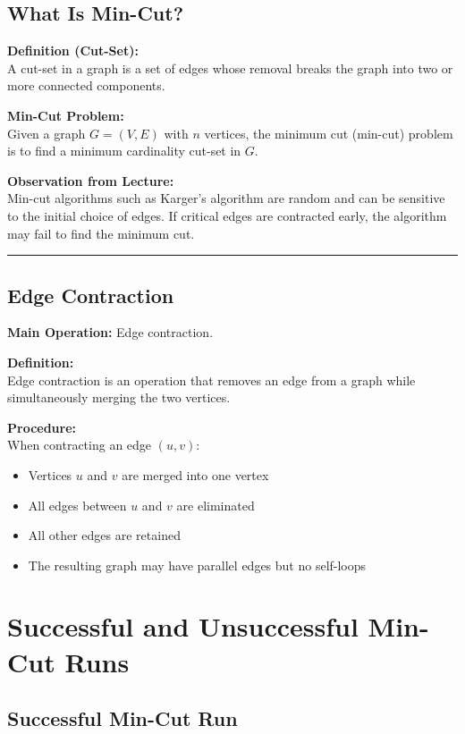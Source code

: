 \documentclass[12pt]{article}
\begin{document}
\subsection{What Is Min-Cut?}

\textbf{Definition (Cut-Set):} \\
A cut-set in a graph is a set of edges whose removal breaks the graph into two or more connected components.

\textbf{Min-Cut Problem:} \\
Given a graph \( G = (V, E) \) with \( n \) vertices, the minimum cut (min-cut) problem is to find a minimum cardinality cut-set in \( G \).

\textbf{Observation from Lecture:} \\
Min-cut algorithms such as Karger’s algorithm are random and can be sensitive to the initial choice of edges. If critical edges are contracted early, the algorithm may fail to find the minimum cut.

\hrule
\vspace{1em}

\subsection{Edge Contraction}

\textbf{Main Operation:} Edge contraction.

\textbf{Definition:} \\
Edge contraction is an operation that removes an edge from a graph while simultaneously merging the two vertices.

\textbf{Procedure:} \\
When contracting an edge \( (u, v) \):
\begin{itemize}
    \item Vertices \( u \) and \( v \) are merged into one vertex
    \item All edges between \( u \) and \( v \) are eliminated
    \item All other edges are retained
    \item The resulting graph may have parallel edges but no self-loops
\end{itemize}

\section{Successful and Unsuccessful Min-Cut Runs}

\subsection{Successful Min-Cut Run}
\end{document}
